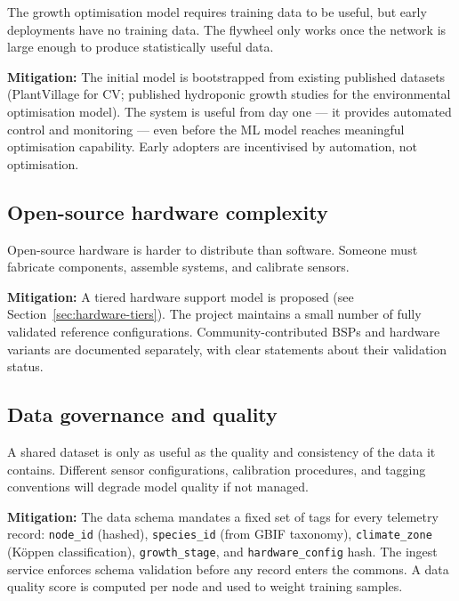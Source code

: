 The growth optimisation model requires training data to be useful, but early deployments have no training data. The flywheel only works once the network is large enough to produce statistically useful data.

\textbf{Mitigation:} The initial model is bootstrapped from existing published datasets (PlantVillage for CV; published hydroponic growth studies for the environmental optimisation model). The system is useful from day one --- it provides automated control and monitoring --- even before the ML model reaches meaningful optimisation capability. Early adopters are incentivised by automation, not optimisation.

\subsection{Open-source hardware complexity}

Open-source hardware is harder to distribute than software. Someone must fabricate components, assemble systems, and calibrate sensors.

\textbf{Mitigation:} A tiered hardware support model is proposed (see Section~\ref{sec:hardware-tiers}). The project maintains a small number of fully validated reference configurations. Community-contributed BSPs and hardware variants are documented separately, with clear statements about their validation status.

\subsection{Data governance and quality}

A shared dataset is only as useful as the quality and consistency of the data it contains. Different sensor configurations, calibration procedures, and tagging conventions will degrade model quality if not managed.

\textbf{Mitigation:} The data schema mandates a fixed set of tags for every telemetry record: \texttt{node\_id} (hashed), \texttt{species\_id} (from GBIF taxonomy), \texttt{climate\_zone} (Köppen classification), \texttt{growth\_stage}, and \texttt{hardware\_config} hash. The ingest service enforces schema validation before any record enters the commons. A data quality score is computed per node and used to weight training samples.

